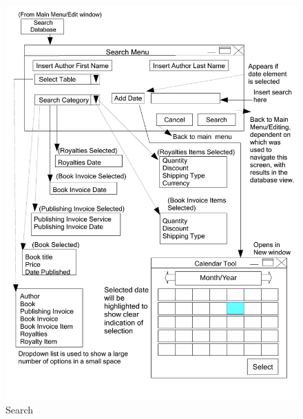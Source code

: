 \begin{figure}[H]
    \caption{Search} \label{Search.pdf}
    \includegraphics[width=\textwidth]{./Design/UserInterfaceDesign/Search.pdf}
\end{figure}


